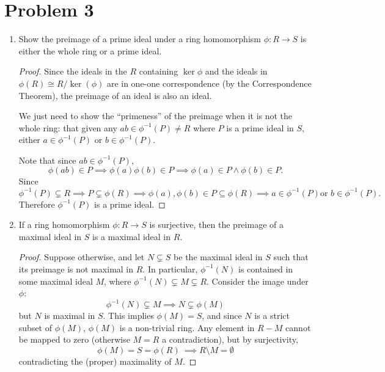 \documentclass{article}
\theoremstyle{plain}
\begin{document}
\section*{Problem 3}
\begin{enumerate}
  \item Show the preimage of a prime ideal under a ring homomorphism $\phi:R\to S$ is either
        the whole ring or a prime ideal.
\begin{proof}

  Since the ideals in the $R$ containing $\ker\phi$ and the ideals in
  $\phi(R)\cong R/\ker(\phi)$ are in one-one correspondence (by the Correspondence
  Theorem), the preimage of an ideal is also an ideal.

  We just need to show the ``primeness'' of the preimage when it is not the
  whole ring: that given any $ab\in \phi^{-1}(P)\neq R$ where $P$ is a prime ideal in
  $S$, either $a\in\phi^{-1}(P)$ or $b\in\phi^{-1}(P)$.


  Note that since $ab\in \phi^{-1}(P)$,
  \[\phi(ab)\in P\implies\phi(a)\phi(b)\in P\implies \phi(a)\in P \wedge \phi(b)\in P.\]
  Since
  \[\phi^{-1}(P)\subsetneq R \implies P\subsetneq\phi(R) \implies \phi(a),\phi(b)\in P\subseteq\phi(R)\implies a\in \phi^{-1}(P)\text{
      or }b\in \phi^{-1}(P).\] Therefore $\phi^{-1}(P)$ is a prime ideal.
\end{proof}

\item If a ring homomorphism $\phi:R\to S$ is surjective, then the preimage of a
maximal ideal in $S$ is a maximal ideal in $R$.
\begin{proof}
  Suppose otherwise, and let $N\subsetneq S$ be the maximal ideal in $S$ such that its
  preimage is not maximal in $R$. In particular, $\phi^{-1}(N)$ is contained in
  some maximal ideal $M$, where $\phi^{-1}(N)\subsetneq M \subsetneq R$. Consider the image under
  $\phi$:
  \[\phi^{-1}(N)\subsetneq M\implies N\subsetneq \phi(M)\]
  but $N$ is maximal in $S$. This implies $\phi(M)=S$, and since $N$ is a strict
  subset of $\phi(M)$, $\phi(M)$ is a non-trivial ring. Any element in $R-M$ cannot be
  mapped to zero (otherwise $M=R$ a contradiction), but by surjectivity,
  \[\phi(M)=S=\phi(R)\ \implies R\setminus M=\emptyset\]
  contradicting the (proper) maximality of $M$.
\end{proof}
\end{enumerate}
\end{document}
